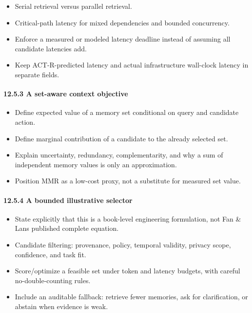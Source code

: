 \begin{itemize}
\tightlist
\item
  Serial retrieval versus parallel retrieval.
\item
  Critical-path latency for mixed dependencies and bounded concurrency.
\item
  Enforce a measured or modeled latency deadline instead of assuming all candidate latencies add.
\item
  Keep ACT-R-predicted latency and actual infrastructure wall-clock latency in separate fields.
\end{itemize}

\paragraph{12.5.3 A set-aware context objective}\label{1253-a-set-aware-context-objective}

\begin{itemize}
\tightlist
\item
  Define expected value of a memory set conditional on query and candidate action.
\item
  Define marginal contribution of a candidate to the already selected set.
\item
  Explain uncertainty, redundancy, complementarity, and why a sum of independent memory values is only an approximation.
\item
  Position MMR as a low-cost proxy, not a substitute for measured set value.
\end{itemize}

\paragraph{12.5.4 A bounded illustrative selector}\label{1254-a-bounded-illustrative-selector}

\begin{itemize}
\tightlist
\item
  State explicitly that this is a book-level engineering formulation, not Fan \& Lan\textquotesingle s published complete equation.
\item
  Candidate filtering: provenance, policy, temporal validity, privacy scope, confidence, and task fit.
\item
  Score/optimize a feasible set under token and latency budgets, with careful no-double-counting rules.
\item
  Include an auditable fallback: retrieve fewer memories, ask for clarification, or abstain when evidence is weak.
\end{itemize}

